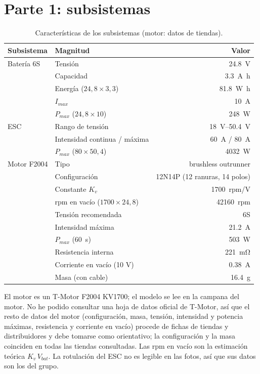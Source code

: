 \documentclass[11pt,a4paper]{article}
\begin{document}
\section{Parte 1: subsistemas}
\begin{table}[h]
  \centering
  \caption{Características de los subsistemas (motor: datos de tiendas).}
  \begin{tabular}{l l r}
    \toprule
    Subsistema & Magnitud & Valor \\
    \midrule
    Batería 6S & Tensión & \SI{24.8}{\volt} \\
               & Capacidad & \SI{3.3}{\ampere\hour} \\
               & Energía ($24{,}8\times 3{,}3$) & \SI{81.8}{\watt\hour} \\
               & $I_{max}$ & \SI{10}{\ampere} \\
               & $P_{max}$ ($24{,}8\times 10$) & \SI{248}{\watt} \\
    \midrule
    ESC        & Rango de tensión & \SIrange{18}{50.4}{\volt} \\
               & Intensidad continua / máxima & \SI{60}{\ampere} / \SI{80}{\ampere} \\
               & $P_{max}$ ($80\times 50{,}4$) & \SI{4032}{\watt} \\
    \midrule
    Motor F2004 & Tipo & brushless outrunner \\
               & Configuración & 12N14P (12 ranuras, 14 polos) \\
               & Constante $K_v$ & \SI{1700}{rpm/\volt} \\
               & rpm en vacío ($1700\times 24{,}8$) & \SI{42160}{rpm} \\
               & Tensión recomendada & 6S \\
               & Intensidad máxima & \SI{21.2}{\ampere} \\
               & $P_{max}$ (\SI{60}{\second}) & \SI{503}{\watt} \\
               & Resistencia interna & \SI{221}{\milli\ohm} \\
               & Corriente en vacío (10 V) & \SI{0.38}{\ampere} \\
               & Masa (con cable) & \SI{16.4}{\gram} \\
    \bottomrule
  \end{tabular}
\end{table}
El motor es un T-Motor F2004 KV1700; el modelo se lee en la campana del motor. No he podido consultar una hoja de datos oficial de T-Motor, así que el resto de datos del motor (configuración, masa, tensión, intensidad y potencia máximas, resistencia y corriente en vacío) procede de fichas de tiendas y distribuidores y debe tomarse como orientativo; la configuración y la masa coinciden en todas las tiendas consultadas. Las rpm en vacío son la estimación teórica $K_v\,V_{bat}$. La rotulación del ESC no es legible en las fotos, así que sus datos son los del grupo.
\end{document}

